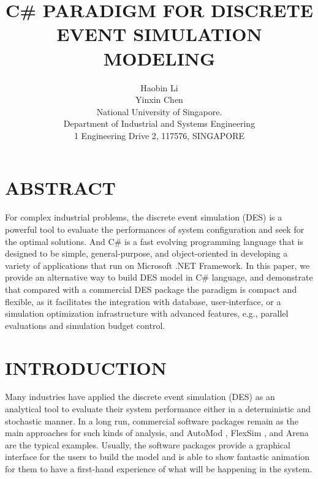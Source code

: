 \documentclass{wscpaperproc}
\theoremstyle{wsc}
\begin{document}
%
%

\title{C\# PARADIGM FOR DISCRETE EVENT SIMULATION MODELING}

\author{Haobin Li\\Yinxin Chen\\ [12pt]
	National University of Singapore.\\
	Department of Industrial and Systems Engineering\\
	1 Engineering Drive 2, 117576, SINGAPORE
}

\maketitle

\section*{ABSTRACT}

For complex industrial problems, the discrete event simulation (DES) is a powerful tool to evaluate the performances of system configuration and seek for the optimal solutions. And C\# is a fast evolving programming language that is designed to be simple, general-purpose, and object-oriented in developing a variety of applications that run on Microsoft .NET Framework. In this paper, we provide an alternative way to build DES model in C\# language, and demonstrate that compared with a commercial DES package the paradigm is compact and flexible, as it facilitates the integration with database, user-interface, or a simulation optimization infrastructure with advanced features, e.g., parallel evaluations and simulation budget control.

\section{INTRODUCTION}

Many industries have applied the discrete event simulation (DES) as an analytical tool to evaluate their system performance either in a deterministic and stochastic manner. In a long run, commercial software packages remain as the main approaches for such kinds of analysis, and AutoMod , FlexSim , and Arena  are the typical examples. Usually, the software packages provide a graphical interface for the users to build the model and is able to show fantastic animation for them to have a first-hand experience of what will be happening in the system.
\end{document}
